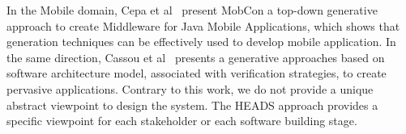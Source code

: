 In the Mobile domain, Cepa et al~\cite{1385821} present MobCon a top-down generative approach to create Middleware for Java Mobile Applications, which shows that generation techniques can be effectively used to develop mobile application. In the same direction, Cassou et al~\cite{Cassou:2011:LSA:1985793.1985852} presents a generative approaches based on software architecture model, associated with verification strategies, to create pervasive applications. Contrary to this work, we do not provide a unique abstract viewpoint to design the system. The HEADS approach provides a specific viewpoint for each stakeholder or each software building stage.

